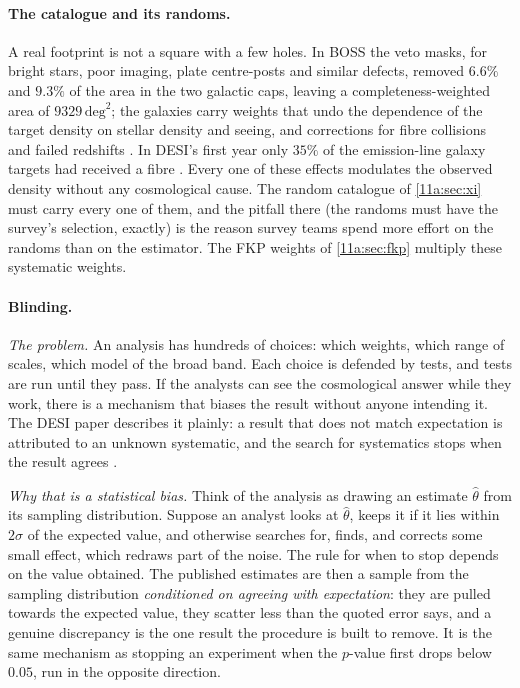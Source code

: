 \paragraph{The catalogue and its randoms.}
A real footprint is not a square with a few holes. In BOSS the veto masks, for
bright stars, poor imaging, plate centre-posts and similar defects, removed
$6.6\%$ and $9.3\%$ of the area in the two galactic caps, leaving a
completeness-weighted area of $9329\,\mathrm{deg}^2$; the galaxies carry weights
that undo the dependence of the target density on stellar density and seeing,
and corrections for fibre collisions and failed redshifts
. In DESI's first year only $35\%$ of the emission-line
galaxy targets had received a fibre . Every one of these
effects modulates the observed density without any cosmological cause. The
random catalogue of \cref{11a:sec:xi} must carry every one of them, and the
pitfall there (the randoms must have the survey's selection, exactly) is the
reason survey teams spend more effort on the randoms than on the estimator. The
FKP weights of \cref{11a:sec:fkp} multiply these systematic weights.

\paragraph{Blinding.}
\emph{The problem.} An analysis has hundreds of choices: which weights, which
range of scales, which model of the broad band. Each choice is defended by tests,
and tests are run until they pass. If the analysts can see the cosmological
answer while they work, there is a mechanism that biases the result without
anyone intending it. The DESI paper describes it plainly: a result that does not
match expectation is attributed to an unknown systematic, and the search for
systematics stops when the result agrees .

\emph{Why that is a statistical bias.} Think of the analysis as drawing an
estimate $\hat\theta$ from its sampling distribution. Suppose an analyst looks at
$\hat\theta$, keeps it if it lies within $2\sigma$ of the expected value, and
otherwise searches for, finds, and corrects some small effect, which redraws
part of the noise. The rule for when to stop depends on the value obtained.
The published estimates are then a sample from the sampling distribution
\emph{conditioned on agreeing with expectation}: they are pulled towards the
expected value, they scatter less than the quoted error says, and a genuine
discrepancy is the one result the procedure is built to remove. It is the same
mechanism as stopping an experiment when the $p$-value first drops below $0.05$,
run in the opposite direction.

